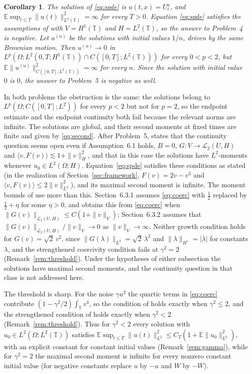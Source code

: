 \documentclass[11pt]{amsart}
\newtheorem{corollary}[theorem]{Corollary}
\theoremstyle{remark}
\newcommand{\E}{\mathbb E}
\newcommand{\T}{\mathbb T}
\newcommand{\HS}{\mathcal L_2}
\begin{document}
\begin{corollary}\label{cor:spde}
The solution of \eqref{eq:spde} is $u(t,x)=U_t^a$, and $\E\sup_{t\le T}\|u(t)\|_{L^2(\T)}^2=\infty$ for every $T>0$. Equation \eqref{eq:spde} satisfies the assumptions of \cite[Theorem~6.4]{AV25} with $V=H^1(\T)$ and $H=L^2(\T)$, so the answer to Problem~4 is negative. Let $u^{(n)}$ be the solutions with initial values $1/n$, driven by the same Brownian motion. Then $u^{(n)}\to0$ in $L^p(\Omega;L^2(0,T;H^1(\T))\cap C([0,T];L^2(\T)))$ for every $0<p<2$, but $\E\|u^{(n)}\|_{C([0,T];L^2(\T))}^2=\infty$ for every $n$. Since the solution with initial value $0$ is $0$, the answer to Problem~5 is negative as well.
\end{corollary}

In both problems the obstruction is the same: the solutions belong to $L^p(\Omega;C([0,T];L^2))$ for every $p<2$ but not for $p=2$, so the endpoint estimate and the endpoint continuity both fail because the relevant norms are infinite. The solutions are global, and their second moments at fixed times are finite and given by \eqref{eq:second}. After Problem~5, \cite{AV25} states that the continuity question seems open even if Assumption~6.1 holds, $B=0$, $G\colon V\to\HS(U,H)$ and $\langle v,F(v)\rangle\lesssim1+\|v\|_H^2$, and that in this case the solutions have $L^2$-moments whenever $u_0\in L^2(\Omega;H)$. Equation~\eqref{eq:spde} satisfies these conditions as stated (in the realization of Section~\ref{sec:framework}, $F(v)=2v-v^3$ and $\langle v,F(v)\rangle\le2\|v\|_{L^2}^2$), and its maximal second moment is infinite. The moment bounds of \cite[Section~6.3]{AV25} use more than this. Section~6.3.1 assumes \eqref{eq:coerc} with $\frac12$ replaced by $\frac12+\eta$ for some $\eta>0$, and obtains this from \eqref{eq:coerc} when $\|G(v)\|_{\HS(U,H)}\le C(1+\|v\|_V)$; Section~6.3.2 assumes that $\|G(v)\|_{\HS(U,H)}/\|v\|_V\to0$ as $\|v\|_V\to\infty$. Neither growth condition holds for $G(v)=\sqrt2\,v^2$, since $\|G(\lambda)\|_{L^2}=\sqrt2\,\lambda^2$ and $\|\lambda\|_{H^1}=|\lambda|$ for constants $\lambda$, and the strengthened coercivity condition fails at $\gamma^2=2$ (Remark~\ref{rem:threshold}). Under the hypotheses of either subsection the solutions have maximal second moments, and the continuity question in that class is not addressed here.

The threshold is sharp. For the noise $\gamma u^2$ the quartic terms in \eqref{eq:coerc} contribute $(1-\gamma^2/2)\int_\T v^4$, so the condition of \cite[Theorem~6.4]{AV25} holds exactly when $\gamma^2\le2$, and the strengthened condition of \cite[Section~6.3.1]{AV25} holds exactly when $\gamma^2<2$ (Remark~\ref{rem:threshold}). Thus for $\gamma^2<2$ every solution with $u_0\in L^2(\Omega;L^2(\T))$ satisfies $\E\sup_{t\le T}\|u(t)\|_{L^2}^2\le C_T(1+\E\|u_0\|_{L^2}^2)$, with an explicit constant for constant initial values (Remark~\ref{rem:gamma}), while for $\gamma^2=2$ the maximal second moment is infinite for every nonzero constant initial value (for negative constants replace $u$ by $-u$ and $W$ by $-W$).
\end{document}
